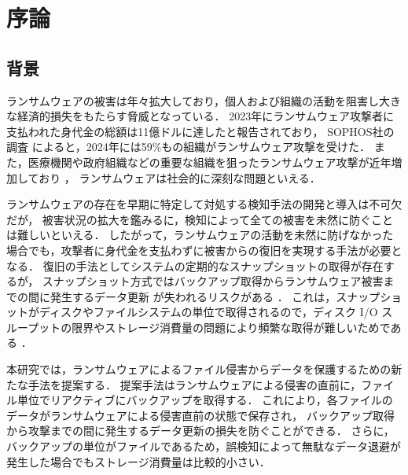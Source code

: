 \chapter{序論}
\section{背景}
ランサムウェアの被害は年々拡大しており，個人および組織の活動を阻害し大きな経済的損失をもたらす脅威となっている．
2023年にランサムウェア攻撃者に支払われた身代金の総額は11億ドルに達したと報告されており\cite{Ransomwa86:online}，
SOPHOS社の調査 \cite{sophos-report:online} によると，2024年には59\%もの組織がランサムウェア攻撃を受けた．
また，医療機関や政府組織などの重要な組織を狙ったランサムウェア攻撃が近年増加しており \cite{sophos-report:online}，
ランサムウェアは社会的に深刻な問題といえる．

ランサムウェアの存在を早期に特定して対処する検知手法の開発と導入は不可欠だが，
被害状況の拡大を鑑みるに，検知によって全ての被害を未然に防ぐことは難しいといえる．
したがって，ランサムウェアの活動を未然に防げなかった場合でも，攻撃者に身代金を支払わずに被害からの復旧を実現する手法が必要となる．
復旧の手法としてシステムの定期的なスナップショットの取得が存在するが，
スナップショット方式ではバックアップ取得からランサムウェア被害までの間に発生するデータ更新
が失われるリスクがある \cite{wang2024ransom}．
これは，スナップショットがディスクやファイルシステムの単位で取得されるので，ディスク I/O スループットの限界やストレージ消費量の問題により頻繁な取得が難しいためである \cite{veena2021incremental, wang2024ransom}．

本研究では，ランサムウェアによるファイル侵害からデータを保護するための新たな手法を提案する．
提案手法はランサムウェアによる侵害の直前に，ファイル単位でリアクティブにバックアップを取得する．
これにより，各ファイルのデータがランサムウェアによる侵害直前の状態で保存され，
バックアップ取得から攻撃までの間に発生するデータ更新の損失を防ぐことができる．
さらに，バックアップの単位がファイルであるため，誤検知によって無駄なデータ退避が発生した場合でもストレージ消費量は比較的小さい．
